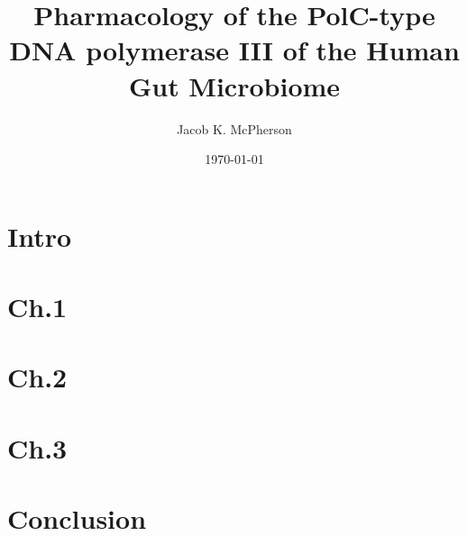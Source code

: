 \documentclass[aspectratio=169]{beamer}
\title[My Talk]{Pharmacology of the PolC-type DNA polymerase III of the Human Gut Microbiome}
\author{Jacob K. McPherson}
\institute{
Department of Pharmacological and Pharmaceutical Sciences\\
University of Houston
}
\date[\today]{\today} %
\begin{document}
\begin{frame}[plain]\titlepage\end{frame}
\section{Intro}

\section{Ch.1}
\section{Ch.2}
\section{Ch.3}
\section{Conclusion}


\end{document}
